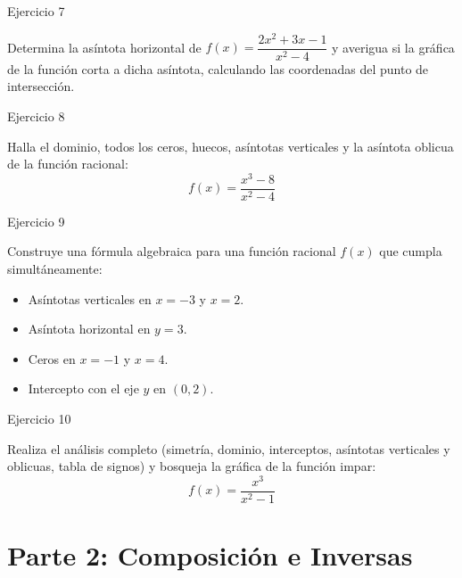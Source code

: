 \documentclass[aspectratio=169]{beamer}
\begin{document}
\begin{frame}{Ejercicio 7}
  \begin{mwejercicio}
    Determina la asíntota horizontal de $f(x) = \dfrac{2x^2 + 3x - 1}{x^2 - 4}$ y averigua si la gráfica de la función corta a dicha asíntota, calculando las coordenadas del punto de intersección.
  \end{mwejercicio}
  \vspace{3.5cm}
\end{frame}
\begin{frame}{Ejercicio 8}
  \begin{mwejercicio}
    Halla el dominio, todos los ceros, huecos, asíntotas verticales y la asíntota oblicua de la función racional:
    $$f(x) = \frac{x^3 - 8}{x^2 - 4}$$
  \end{mwejercicio}
  \vspace{3.5cm}
\end{frame}
\begin{frame}{Ejercicio 9}
  \begin{mwejercicio}
    Construye una fórmula algebraica para una función racional $f(x)$ que cumpla simultáneamente:
    \begin{itemize}
      \item Asíntotas verticales en $x = -3$ y $x = 2$.
      \item Asíntota horizontal en $y = 3$.
      \item Ceros en $x = -1$ y $x = 4$.
      \item Intercepto con el eje $y$ en $(0, 2)$.
    \end{itemize}
  \end{mwejercicio}
  \vspace{2.5cm}
\end{frame}
\begin{frame}{Ejercicio 10}
  \begin{mwejercicio}
    Realiza el análisis completo (simetría, dominio, interceptos, asíntotas verticales y oblicuas, tabla de signos) y bosqueja la gráfica de la función impar:
    $$f(x) = \frac{x^3}{x^2 - 1}$$
  \end{mwejercicio}
  \vspace{3.5cm}
\end{frame}


\section{Parte 2: Composición e Inversas}
\end{document}
